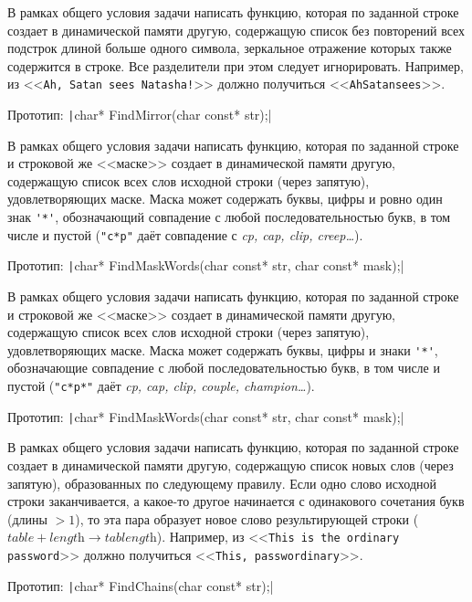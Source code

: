 \begin{zztask}
В рамках общего условия задачи написать функцию, которая по заданной строке
создает в динамической памяти другую, содержащую список без повторений всех
подстрок длиной больше одного символа, зеркальное отражение которых также
содержится в строке. Все разделители при этом следует игнорировать.
Например, из
<<\texttt{Ah, Satan sees Natasha!}>>
должно получиться
<<\texttt{AhSatansees}>>.

Прототип: \texttt|char* FindMirror(char const* str);|
\end{zztask}

\begin{zztask}
В рамках общего условия задачи написать функцию, которая по заданной строке
и строковой же <<маске>> создает в динамической памяти другую, содержащую список
всех слов исходной строки (через запятую), удовлетворяющих маске. Маска может
содержать буквы, цифры и ровно один знак \verb|'*'|, обозначающий совпадение с любой
последовательностью букв, в том числе и пустой (\verb|"c*p"| даёт совпадение с
\textit{cp, cap, clip, creep\dots}).

Прототип: \texttt|char* FindMaskWords(char const* str, char const* mask);|
\end{zztask}

\begin{zztask}
В рамках общего условия задачи написать функцию, которая по заданной строке
и строковой же <<маске>> создает в динамической памяти другую, содержащую список
всех слов исходной строки (через запятую), удовлетворяющих маске. Маска может
содержать буквы, цифры и знаки \verb|'*'|, обозначающие совпадение с любой
последовательностью букв, в том числе и пустой (\verb|"c*p*"| даёт
\textit{cp, cap, clip, couple, champion\dots}).

Прототип: \texttt|char* FindMaskWords(char const* str, char const* mask);|
\end{zztask}

\begin{zztask}
В рамках общего условия задачи написать функцию, которая по заданной строке
создает в динамической памяти другую, содержащую список новых слов (через
запятую), образованных по следующему правилу. Если одно слово исходной строки
заканчивается, а какое-то другое начинается с одинакового сочетания букв
(длины $> 1$), то эта пара образует новое слово результирующей строки
($\textit{table} + \textit{length} \rightarrow \textit{tablength}$).
Например, из
<<\texttt{This is the ordinary password}>>
должно получиться
<<\texttt{This, passwordinary}>>.

Прототип: \texttt|char* FindChains(char const* str);|
\end{zztask}

